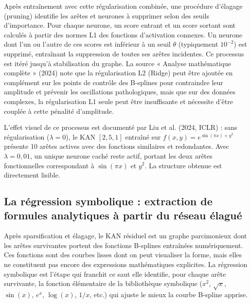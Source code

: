 \documentclass[11pt,a4paper,oneside]{report}
\theoremstyle{definition}
\theoremstyle{remark}
\begin{document}
Après entraînement avec cette régularisation combinée, une procédure d'élagage (pruning) identifie les arêtes et neurones à supprimer selon des seuils d'importance. Pour chaque neurone, un score entrant et un score sortant sont calculés à partir des normes L1 des fonctions d'activation connexes. Un neurone dont l'un ou l'autre de ces scores est inférieur à un seuil $\theta$ (typiquement $10^{-2}$) est supprimé, entraînant la suppression de toutes ses arêtes incidentes. Ce processus est itéré jusqu'à stabilisation du graphe. La source « Analyse mathématique complète » (2024) note que la régularisation L2 (Ridge) peut être ajoutée en complément sur les points de contrôle des B-splines pour contraindre leur amplitude et prévenir les oscillations pathologiques, mais que sur des données complexes, la régularisation L1 seule peut être insuffisante et nécessite d'être couplée à cette pénalité d'amplitude.

L'effet visuel de ce processus est documenté par Liu et al. (2024, ICLR) : sans régularisation ($\lambda = 0$), le KAN $[2,5,1]$ entraîné sur $f(x,y) = e^{\sin(\pi x) + y^2}$ présente 10 arêtes actives avec des fonctions similaires et redondantes. Avec $\lambda = 0{,}01$, un unique neurone caché reste actif, portant les deux arêtes fonctionnelles correspondant à $\sin(\pi x)$ et $y^2$. La structure obtenue est directement lisible.

\subsection{La régression symbolique : extraction de formules analytiques à partir du réseau élagué}

Après sparsification et élagage, le KAN résiduel est un graphe parcimonieux dont les arêtes survivantes portent des fonctions B-splines entraînées numériquement. Ces fonctions sont des courbes lisses dont on peut visualiser la forme, mais elles ne constituent pas encore des expressions mathématiques explicites. La régression symbolique est l'étape qui franchit ce saut  elle identifie, pour chaque arête survivante, la fonction élémentaire de la bibliothèque symbolique ($x^2$, $\sqrt{x}$, $\sin(x)$, $e^x$, $\log(x)$, $1/x$, etc.) qui ajuste le mieux la courbe B-spline apprise.
\end{document}
